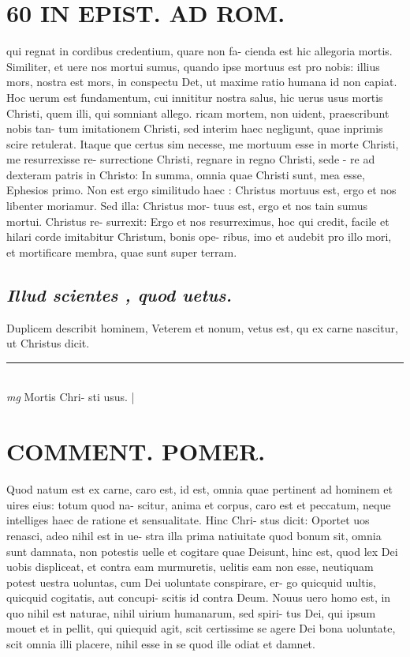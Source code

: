 \documentclass{article}
\begin{document}
\begin{pages}
\section*{60 IN EPIST. AD ROM.  }
\marginpar{[ p.]}\pstart qui regnat in cordibus credentium, quare non fa- cienda est hic allegoria mortis. Similiter, et uere nos mortui sumus, quando ipse mortuus est pro nobis: illius mors, nostra est mors, in conspectu Det, ut maxime ratio humana id non capiat. Hoc uerum est fundamentum, cui innititur nostra salus, hic uerus usus mortis Christi, quem illi, qui somniant allego.  ricam mortem, non uident, praescribunt nobis tan- tum imitationem Christi, sed interim haec negligunt, quae inprimis scire retulerat. Itaque que certus sim necesse, me mortuum esse in morte Christi, me resurrexisse re- surrectione Christi, regnare in regno Christi, sede - re ad dexteram patris in Christo: In summa, omnia quae Christi sunt, mea esse, Ephesios primo. Non est ergo similitudo haec : Christus mortuus est, ergo et nos libenter moriamur. Sed illa: Christus mor- tuus est, ergo et nos tain sumus mortui. Christus re- surrexit: Ergo et nos resurreximus, hoc qui credit, facile et hilari corde imitabitur Christum, bonis ope- ribus, imo et audebit pro illo mori, et mortificare membra, quae sunt super terram.   \pend
{}
{}
\subsection*{\textit{Illud scientes , quod uetus. }}\pstart Duplicem describit hominem, Veterem et nonum, vetus est, qu ex carne nascitur, ut Christus dicit.  \pend
\vspace{0.5cm}\noindent
\vspace{0.2cm}\rule{1cm}{0.2pt}\\ 
\hspace{0.2cm}\textit{mg}
\footnotesize Mortis Chri- sti usus.  
\normalsize| 
\section*{COMMENT. POMER.  }\pstart Quod natum est ex carne, caro est, id est, omnia quae pertinent ad hominem et uires eius: totum quod na- scitur, anima et corpus, caro est et peccatum, neque  intelliges haec de ratione et sensualitate. Hinc Chri- stus dicit: Oportet uos renasci, adeo nihil est in ue- stra illa prima natiuitate quod bonum sit, omnia sunt damnata, non potestis uelle et cogitare quae Deisunt, hinc est, quod lex Dei uobis displiceat, et contra eam murmuretis, uelitis eam non esse, neutiquam potest uestra uoluntas, cum Dei uoluntate conspirare, er- go quicquid uultis, quicquid cogitatis, aut concupi- scitis id contra Deum. Nouus uero homo est, in quo nihil est naturae, nihil uirium humanarum, sed spiri- tus Dei, qui ipsum mouet et in pellit, qui quiequid agit, scit certissime se agere Dei bona uoluntate, scit omnia illi placere, nihil esse in se quod ille odiat et damnet.   \pend
{}
{}

\end{pages}
\end{document}
